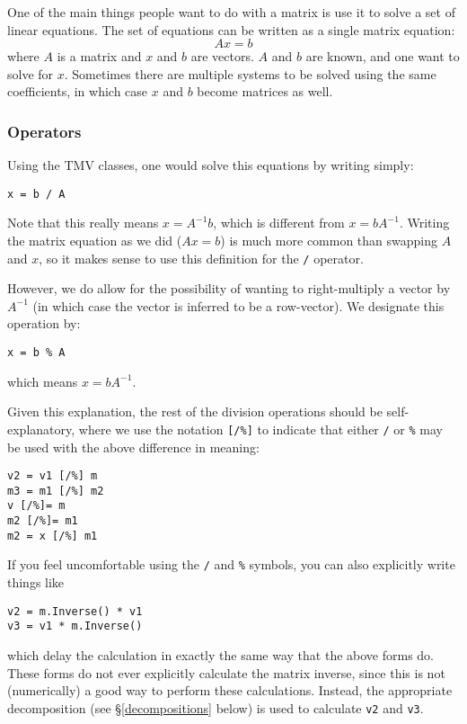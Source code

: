 \documentclass[twoside,letterpaper,11pt]{article}
\renewcommand{\tt}[1]{{\texttt {#1}}}
\begin{document}
One of the main things people want to do with a matrix is use it to solve a 
set of linear equations.  The set of equations can be written as a single matrix
equation:
\begin{equation}
\nonumber
A x = b
\end{equation}
where $A$ is a matrix and $x$ and $b$ are vectors.  $A$ and $b$ are known, 
and one want to solve for $x$.  Sometimes there are
multiple systems to be solved using the same coefficients, in which case
$x$ and $b$ become matrices as well.

\subsubsection{Operators}

Using the TMV classes, one would solve this equations by writing simply:
\begin{verbatim}
x = b / A
\end{verbatim}
Note that this really means $x = A^{-1} b$, which is different from $x = b A^{-1}$.
Writing the matrix equation as we did ($A x=b$) is much more common than 
swapping $A$ and $x$, so it makes sense to use this definition for the \tt{/}
operator.

However, we do allow for the possibility of wanting to right-multiply a vector
by $A^{-1}$ (in which case the vector is inferred to be a row-vector).  We designate
this operation by:
\begin{verbatim}
x = b % A
\end{verbatim}
which means $x = b A^{-1}$.

Given this explanation, the rest of the division operations should be self-explanatory,
where we use the notation \tt{[/\%]} to indicate that either \tt{/} or \tt{\%} may
be used with the above difference in meaning:
\begin{verbatim}
v2 = v1 [/%] m
m3 = m1 [/%] m2
v [/%]= m
m2 [/%]= m1
m2 = x [/%] m1
\end{verbatim}

If you feel uncomfortable using the \tt{/} and \tt{\%} symbols,
you can also explicitly write things like
\begin{verbatim}
v2 = m.Inverse() * v1
v3 = v1 * m.Inverse()
\end{verbatim}
which delay the calculation in exactly the same way that the above forms do.  
These forms
do not ever explicitly calculate the matrix inverse, since this is not (numerically) a
good way to perform these calculations.  Instead, the appropriate decomposition 
(see \S\ref{decompositions} below)
is used to calculate \tt{v2} and \tt{v3}.
\end{document}
